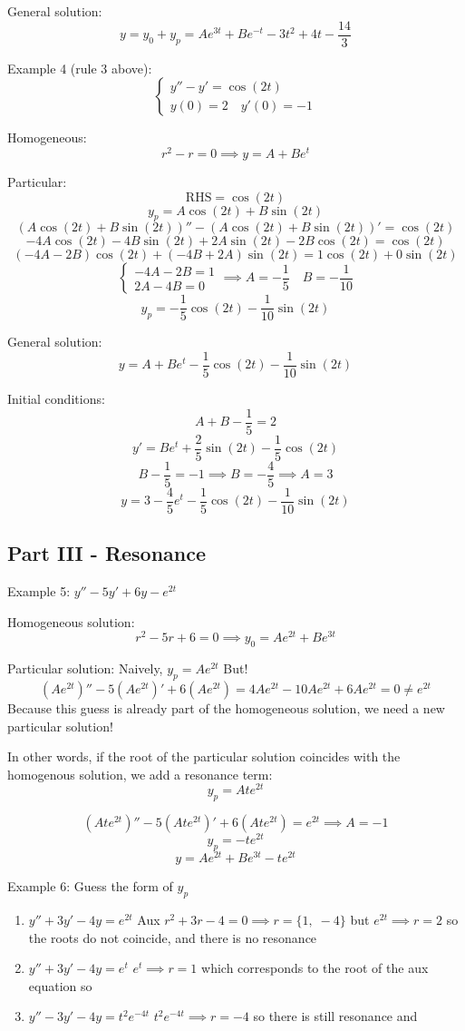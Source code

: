 \documentclass[12pt]{article}
\begin{document}
General solution:
\[y = y_0 + y_p = \boxed{Ae^{3t} + Be^{-t} - 3t^2 + 4t - \frac{14}{3}}\]

Example 4 (rule 3 above):
\[\begin{cases}
    y'' - y' = \cos (2t)\\
    y(0) = 2 \quad y'(0) = -1
\end{cases}\]

Homogeneous:
\[r^2 - r = 0 \implies y = A + Be^t\]

Particular:
\[\text{RHS} = \cos (2t)\]
\[y_p = A\cos(2t) + B\sin(2t)\]
\[(A\cos(2t) + B\sin(2t))'' - (A\cos(2t) + B\sin(2t))' = \cos (2t)\]
\[-4A\cos(2t) -4B\sin(2t) + 2A\sin(2t) - 2B\cos (2t) = \cos (2t)\]
\[(-4A - 2B)\cos(2t) + (-4B + 2A)\sin(2t) = 1\cos(2t) + 0\sin(2t)\]
\[\begin{cases}
    -4A - 2B = 1\\
    2A - 4B = 0\end{cases} \implies A = -\frac{1}{5}\quad B = -\frac{1}{10}\]
\[y_p = -\frac{1}{5}\cos(2t) - \frac{1}{10}\sin (2t)\]

General solution:
\[y = A + Be^t - \frac{1}{5} \cos (2t) - \frac{1}{10} \sin (2t)\]

Initial conditions:
\[A + B - \frac{1}{5} = 2\]
\[y' = Be^t + \frac{2}{5}\sin (2t) - \frac{1}{5}\cos (2t)\]
\[B - \frac{1}{5} = -1 \implies B = -\frac{4}{5} \implies A = 3\]
\[\boxed{y} = 3 - \frac{4}{5}e^t - \frac{1}{5} \cos (2t) - \frac{1}{10}\sin(2t)\]

\subsection*{Part III - Resonance}
Example 5: $y'' - 5y' + 6y - e^{2t}$

Homogeneous solution:
\[r^2 - 5r + 6 = 0 \implies y_0 = Ae^{2t} + Be^{3t} \]

Particular solution:
Naively, $y_p = Ae^{2t}$
But!
\[(Ae^{2t})'' - 5(Ae^{2t})' + 6(Ae^{2t}) = 4Ae^{2t} - 10Ae^{2t} + 6Ae^{2t} = 0 \neq e^{2t}\]
Because this guess is already part of the homogeneous solution, we need a new particular solution!

In other words, if the root of the particular solution coincides with the homogenous solution, we add a resonance term:
\[y_p = Ate^{2t}\]

\[(Ate^{2t})'' - 5(Ate^{2t})' + 6(Ate^{2t}) = e^{2t} \implies A = -1\]
\[y_p = -te^{2t}\]
\[\boxed{y = Ae^{2t} + Be^{3t} - te^{2t}}\]

Example 6: Guess the form of $y_p$
\begin{enumerate}
    \item $y'' + 3y' - 4y = e^{2t}$
    Aux $r^2 + 3r - 4 = 0 \implies r = \{1, \; -4\}$ but $e^{2t} \implies r = 2$ so the roots do not coincide, and there is no resonance
    \item $y'' + 3y' - 4y = e^{t}$
    $e^{t} \implies r = 1$ which corresponds to the root of the aux equation so 
    \item $y'' - 3y' -4y = t^2 e^{-4t}$
    $t^2 e^{-4t} \implies r = -4$ so there is still resonance and 
\end{enumerate}
\end{document}
